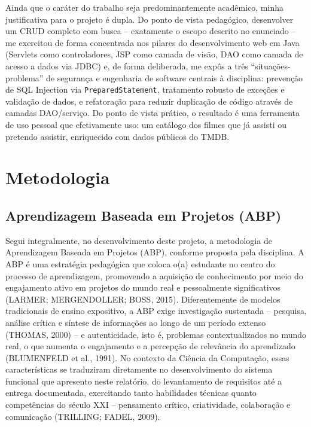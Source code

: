 \documentclass[12pt,a4paper]{article}
\begin{document}
Ainda que o caráter do trabalho seja predominantemente acadêmico, minha justificativa para o
projeto é dupla. Do ponto de vista pedagógico, desenvolver um CRUD completo com busca --
exatamente o escopo descrito no enunciado -- me exercitou de forma concentrada nos pilares do
desenvolvimento web em Java (Servlets como controladores, JSP como camada de visão, DAO como
camada de acesso a dados via JDBC) e, de forma deliberada, me expôs a três
``situações-problema'' de segurança e engenharia de software centrais à disciplina: prevenção de
SQL Injection via \texttt{PreparedStatement}, tratamento robusto de exceções e validação de
dados, e refatoração para reduzir duplicação de código através de camadas DAO/serviço. Do ponto
de vista prático, o resultado é uma ferramenta de uso pessoal que efetivamente uso: um catálogo
dos filmes que já assisti ou pretendo assistir, enriquecido com dados públicos do TMDB.

\section{Metodologia}

\subsection{Aprendizagem Baseada em Projetos (ABP)}

Segui integralmente, no desenvolvimento deste projeto, a metodologia de Aprendizagem Baseada em
Projetos (ABP), conforme proposta pela disciplina. A ABP é uma estratégia pedagógica que coloca
o(a) estudante no centro do processo de aprendizagem, promovendo a aquisição de conhecimento por
meio do engajamento ativo em projetos do mundo real e pessoalmente significativos (LARMER;
MERGENDOLLER; BOSS, 2015). Diferentemente de modelos tradicionais de ensino expositivo, a ABP
exige investigação sustentada -- pesquisa, análise crítica e síntese de informações ao longo de
um período extenso (THOMAS, 2000) -- e autenticidade, isto é, problemas contextualizados no mundo
real, o que aumenta o engajamento e a percepção de relevância do aprendizado (BLUMENFELD et al.,
1991). No contexto da Ciência da Computação, essas características se traduziram diretamente no
desenvolvimento do sistema funcional que apresento neste relatório, do levantamento de
requisitos até a entrega documentada, exercitando tanto habilidades técnicas quanto competências
do século XXI -- pensamento crítico, criatividade, colaboração e comunicação (TRILLING; FADEL,
2009).
\end{document}
